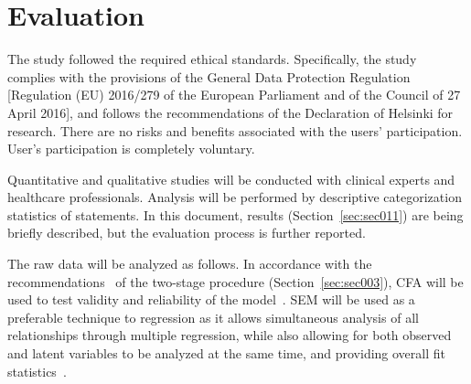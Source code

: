
\section{Evaluation}
\label{sec:sec006}

The study followed the required ethical standards.
Specifically, the study complies with the provisions of the General Data Protection Regulation [Regulation (EU) 2016/279 of the European Parliament and of the Council of 27 April 2016], and follows the recommendations of the Declaration of Helsinki for research.
There are no risks and benefits associated with the users' participation.
User's participation is completely voluntary.

Quantitative and qualitative studies will be conducted with clinical experts and healthcare professionals.
Analysis will be performed by descriptive categorization statistics of statements.
In this document, results (Section~\ref{sec:sec011}) are being briefly described, but the evaluation process is further reported.

The raw data will be analyzed as follows.
In accordance with the recommendations~\cite{rahi2018investigating} of the two-stage procedure (Section~\ref{sec:sec003}), CFA will be used to test validity and reliability of the model~\cite{crede2019questionable}.
SEM will be used as a preferable technique to regression as it allows simultaneous analysis of all relationships through multiple regression, while also allowing for both observed and latent variables to be analyzed at the same time, and providing overall fit statistics~\cite{hair2017advanced}.

